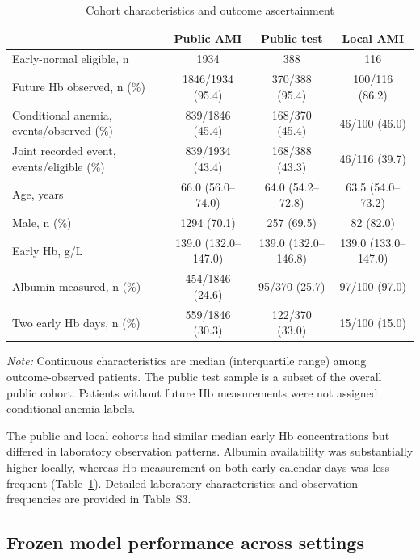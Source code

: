 \documentclass[pdflatex,sn-mathphys-num]{sn-jnl}%
\theoremstyle{thmstyleone}%
\theoremstyle{thmstyletwo}%
\theoremstyle{thmstylethree}%
\begin{document}
\begin{table}[!t]
\caption{Cohort characteristics and outcome ascertainment}
\label{tab:characteristics}
\centering
\footnotesize
\setlength{\tabcolsep}{3pt}
\begin{tabular}{p{4.5cm}ccc}
\toprule
& Public AMI & Public test & Local AMI\\
\midrule
Early-normal eligible, n
& 1934 & 388 & 116\\
Future Hb observed, n (\%)
& 1846/1934 (95.4) & 370/388 (95.4) & 100/116 (86.2)\\
Conditional anemia, events/observed (\%)
& 839/1846 (45.4) & 168/370 (45.4) & 46/100 (46.0)\\
Joint recorded event, events/eligible (\%)
& 839/1934 (43.4) & 168/388 (43.3) & 46/116 (39.7)\\
Age, years
& 66.0 (56.0--74.0) & 64.0 (54.2--72.8) & 63.5 (54.0--73.2)\\
Male, n (\%)
& 1294 (70.1) & 257 (69.5) & 82 (82.0)\\
Early Hb, g/L
& 139.0 (132.0--147.0) & 139.0 (132.0--146.8) & 139.0 (133.0--147.0)\\
Albumin measured, n (\%)
& 454/1846 (24.6) & 95/370 (25.7) & 97/100 (97.0)\\
Two early Hb days, n (\%)
& 559/1846 (30.3) & 122/370 (33.0) & 15/100 (15.0)\\
\bottomrule
\end{tabular}

\vspace{2mm}
\parbox{\textwidth}{\footnotesize
\textit{Note:} Continuous characteristics are median
(interquartile range) among outcome-observed patients.
The public test sample is a subset of the overall public cohort.
Patients without future Hb measurements were not assigned
conditional-anemia labels.
}
\end{table}

The public and local cohorts had similar median early Hb concentrations but differed in laboratory observation patterns. Albumin availability was substantially higher locally, whereas Hb measurement on both early calendar days was less frequent (Table~\ref{tab:characteristics}). Detailed laboratory characteristics and observation frequencies are provided in Table~S3.

\subsection{Frozen model performance across settings}
\end{document}
